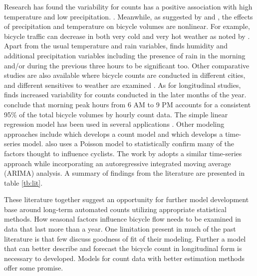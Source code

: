 \documentclass[12pt,letterpaper,article,twocolumn]{memoir}
\begin{document}
Research has found the variability for counts has a positive
association with high temperature and low precipitation. \parencite{Niemeier:1996aa,Parkin:2008aa}. Meanwhile, as suggested by
\textcite{Lewin:2011aa} and \textcite{Thomas:2009aa}, the effects of
precipitation and temperature on bicycle volumes are nonlinear. For
example, bicycle traffic can decrease in both very cold and very hot
weather as noted by \textcite{Richardson:2000aa}. Apart from the usual
temperature and rain variables, \textcite{Miranda-Moreno:2011aa} finds
humidity and additional precipitation variables including the presence
of rain in the morning and/or during the previous three hours to be
significant too. Other comparative studies are also available where
bicycle counts are conducted in different cities, and different
sensitives to weather are examined \parencite{Rose:2011aa}. As for
longitudinal studies, \textcite{Niemeier:1996aa} finds increased variability
for counts conducted in the later months of the year.
\textcite{Jones:2010aa} conclude that morning peak hours from 6 AM to 9 PM
accounts for a consistent 95\% of the total bicycle volumes by hourly
count data. The simple linear regression model has been used in
several applications \parencite{Jones:2008aa,Jones:2010aa}. Other modeling approaches include \textcite{Miranda-Moreno:2011aa} which develops a count
model and \textcite{Thomas:2009aa} which develops a time-series model.
\textcite{Niemeier:1996aa} also uses a Poisson model to statistically
confirm  many of the factors thought to influence cyclists. The
work by \textcite{Gallop:2012aa} adopts a similar time-series approach
while incorporating an autoregressive integrated moving average
(ARIMA) analysis. A summary of findings from the literature are
presented in table \ref{tb:lit}.

These literature together suggest an opportunity for further model
development base around long-term automated counts utilizing
appropriate statistical methods. How seasonal factors influence
bicycle flow needs to be examined in data that last more than a year.
One limitation present in much of the past literature is that few
discuss goodness of fit of their modeling. Further a model that can
better describe and forecast the bicycle count in longitudinal form is
necessary to developed. Models for count data with better estimation
methods offer some promise.
 
\end{document}
